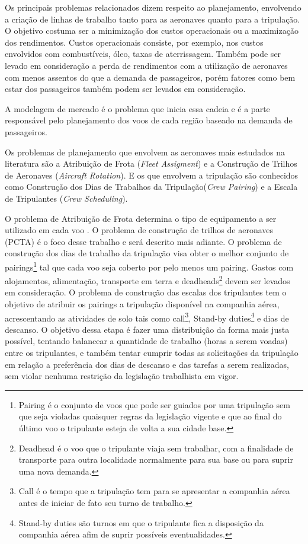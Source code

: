 	Os principais problemas relacionados dizem respeito ao planejamento, envolvendo a criação de linhas de trabalho tanto para as aeronaves quanto para a tripulação. O objetivo costuma ser a minimização dos custos operacionais ou a maximização dos rendimentos. Custos operacionais consiste, por exemplo, nos custos envolvidos com combustíveis, óleo, taxas de aterrissagem. Também pode ser levado em consideração a perda de rendimentos com a utilização de aeronaves com menos assentos do que a demanda de passageiros, porém fatores como bem estar dos passageiros também podem ser levados em consideração.  	
	
	A modelagem de mercado é o problema que inicia essa cadeia e é a parte responsável pelo planejamento dos voos de cada região baseado na demanda de passageiros.
	
	Os problemas de planejamento que envolvem as aeronaves mais estudados na literatura são a Atribuição de Frota (\textit{Fleet Assigment}) e a Construção de Trilhos de Aeronaves (\textit{Aircraft Rotation}). E os que envolvem a tripulação são conhecidos como Construção dos Dias de Trabalhos da Tripulação(\textit{Crew Pairing}) e a Escala de Tripulantes (\textit{Crew Scheduling}).
	  	    
    O problema de Atribuição de Frota determina o tipo de equipamento a ser
    utilizado em cada voo \cite{pimentel2005}. O problema de construção de trilhos de aeronaves (PCTA) é o foco desse trabalho e será descrito mais adiante. O problema de construção dos dias de trabalho da tripulação visa obter o melhor conjunto de pairings\footnote{Pairing é o conjunto de voos que pode ser guiados por uma tripulação sem que seja violadas quaisquer regras da legislação vigente e que ao final do último voo o tripulante esteja de volta a sua cidade base.} tal que cada voo seja coberto por pelo menos um pairing. Gastos com alojamentos, alimentação, transporte em terra e deadheads\footnote{Deadhead é o voo que o tripulante viaja sem trabalhar, com a finalidade de transporte para outra localidade normalmente para sua base ou para suprir uma nova demanda.} devem ser levados em consideração. O problema de construção das escalas dos tripulantes tem o objetivo de atribuir os pairings a tripulação disponível na companhia aérea, acrescentando as atividades de solo tais como call\footnote{Call é o tempo que a tripulação tem para se apresentar a companhia aérea antes de iniciar de fato seu turno de trabalho.}, Stand-by duties\footnote{Stand-by duties são turnos em que o tripulante fica a disposição da companhia aérea afim de suprir possíveis eventualidades.} e dias de descanso. O objetivo dessa etapa é fazer uma distribuição da forma mais justa possível, tentando balancear a quantidade de trabalho (horas a serem voadas) entre os tripulantes, e também tentar cumprir todas as solicitações da tripulação em relação a preferência dos dias de descanso e das tarefas a serem realizadas, sem violar nenhuma restrição da legislação trabalhista em vigor.
    
